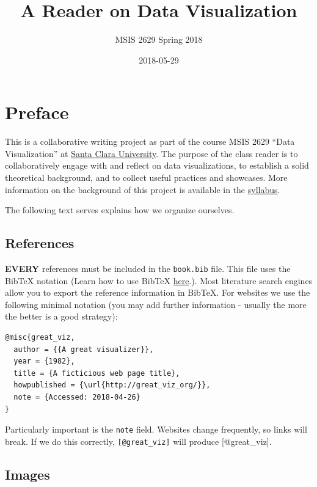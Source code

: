 \documentclass[]{book}
\title{A Reader on Data Visualization}
\author{MSIS 2629 Spring 2018}
\date{2018-05-29}
\theoremstyle{definition}
\theoremstyle{definition}
\theoremstyle{definition}
\theoremstyle{remark}
\begin{document}
\maketitle

{
\setcounter{tocdepth}{1}
\tableofcontents
}
\chapter{Preface}\label{preface}

This is a collaborative writing project as part of the course MSIS 2629
``Data Visualization'' at \href{http://www.scu.edu}{Santa Clara
University}. The purpose of the class reader is to collaboratively
engage with and reflect on data visualizations, to establish a solid
theoretical background, and to collect useful practices and showcases.
More information on the background of this project is available in the
\href{https://mschermann.github.io/msis2629spring2018}{syllabus}.

The following text serves explains how we organize ourselves.

\section{References}\label{references}

\textbf{EVERY} references must be included in the \texttt{book.bib}
file. This file uses the BibTeX notation (Learn how to use BibTeX
\href{http://www.bibtex.org/Using/}{here}.). Most literature search
engines allow you to export the reference information in BibTeX. For
websites we use the following minimal notation (you may add further
information - usually the more the better is a good strategy):

\begin{verbatim}
@misc{great_viz,
  author = {{A great visualizer}},
  year = {1982},
  title = {A ficticious web page title},
  howpublished = {\url{http://great_viz_org/}},
  note = {Accessed: 2018-04-26}
}
\end{verbatim}

Particularly important is the \texttt{note} field. Websites change
frequently, so links will break. If we do this correctly,
\texttt{{[}@great\_viz{]}} will produce {[}@great\_viz{]}.

\section{Images}\label{images}
\end{document}
